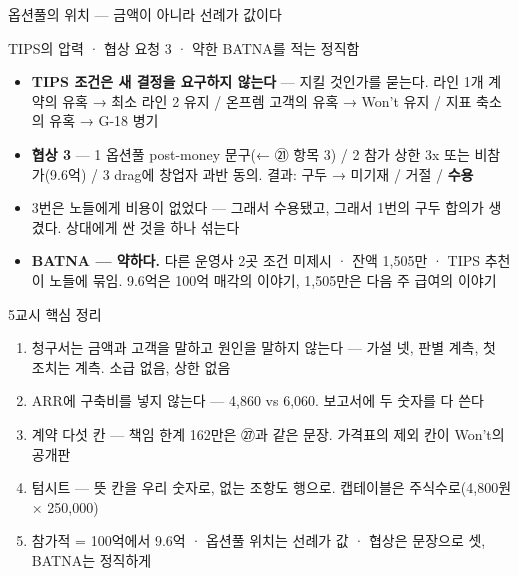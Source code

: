 \begin{frame}{옵션풀의 위치 — 금액이 아니라 선례가 값이다}
\end{frame}

\begin{frame}{TIPS의 압력 · 협상 요청 3 · 약한 BATNA를 적는 정직함}
\begin{itemize}
\item \textbf{TIPS 조건은 새 결정을 요구하지 않는다} — 지킬 것인가를 묻는다. 라인 1개 계약의 유혹 → 최소 라인 2 유지 / 온프렘 고객의 유혹 → Won't 유지 / 지표 축소의 유혹 → G-18 병기
\item \textbf{협상 3} — 1 옵션풀 post-money 문구(← ㉑ 항목 3) / 2 참가 상한 3x 또는 비참가(9.6억) / 3 drag에 창업자 과반 동의. 결과: 구두 → 미기재 / 거절 / \textbf{수용}
\item 3번은 노들에게 비용이 없었다 — 그래서 수용됐고, 그래서 1번의 구두 합의가 생겼다. 상대에게 싼 것을 하나 섞는다
\item \textbf{BATNA — 약하다.} 다른 운영사 2곳 조건 미제시 · 잔액 1,505만 · TIPS 추천이 노들에 묶임. 9.6억은 100억 매각의 이야기, 1,505만은 다음 주 급여의 이야기
\end{itemize}
\end{frame}

\begin{frame}{5교시 핵심 정리}
\begin{enumerate}
\item 청구서는 금액과 고객을 말하고 원인을 말하지 않는다 — 가설 넷, 판별 계측, 첫 조치는 계측. 소급 없음, 상한 없음
\item ARR에 구축비를 넣지 않는다 — 4,860 vs 6,060. 보고서에 두 숫자를 다 쓴다
\item 계약 다섯 칸 — 책임 한계 162만은 ㉗과 같은 문장. 가격표의 제외 칸이 Won't의 공개판
\item 텀시트 — 뜻 칸을 우리 숫자로, 없는 조항도 행으로. 캡테이블은 주식수로(4,800원 × 250,000)
\item 참가적 = 100억에서 9.6억 · 옵션풀 위치는 선례가 값 · 협상은 문장으로 셋, BATNA는 정직하게
\end{enumerate}
\end{frame}

